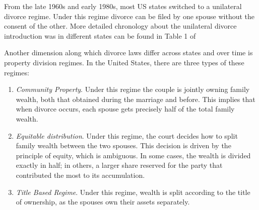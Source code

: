 \documentclass[12pt]{article}
\numberwithin{table}{section}
\begin{document}
From the late 1960s and early 1980s, most US states switched to a unilateral divorce regime. Under this regime divorce can be filed by one spouse without the consent of the other. More detailed chronology about the unilateral divorce introduction was in different states can be found in Table 1 of \cite{ciacci2017}%

Another dimension along which divorce laws differ across states and over time is property division regimes. In the United States, there are three types of these regimes:
\begin{enumerate}
\item \textit{Community Property}. Under this regime the couple is jointly owning family wealth, both that obtained during the marriage and before. This implies that when divorce occurs, each spouse gets precisely half of the total family wealth.
\item \textit{Equitable distribution}. Under this regime, the court decides how to split family wealth between the two spouses. This decision is driven by the principle of equity, which is ambiguous. In some cases, the wealth is divided exactly in half; in others, a larger share reserved for the party that contributed the most to its accumulation.
\item \textit{Title Based Regime}. Under this regime, wealth is split according to the title of ownership, as the spouses own their assets separately.
\end{enumerate}
\end{document}

